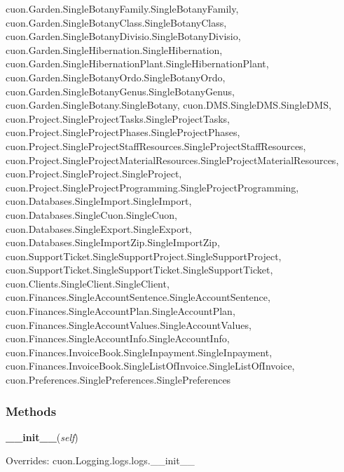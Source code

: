     cuon.Garden.SingleBotanyFamily.SingleBotanyFamily,
    cuon.Garden.SingleBotanyClass.SingleBotanyClass,
    cuon.Garden.SingleBotanyDivisio.SingleBotanyDivisio,
    cuon.Garden.SingleHibernation.SingleHibernation,
    cuon.Garden.SingleHibernationPlant.SingleHibernationPlant,
    cuon.Garden.SingleBotanyOrdo.SingleBotanyOrdo,
    cuon.Garden.SingleBotanyGenus.SingleBotanyGenus,
    cuon.Garden.SingleBotany.SingleBotany,
    cuon.DMS.SingleDMS.SingleDMS,
    cuon.Project.SingleProjectTasks.SingleProjectTasks,
    cuon.Project.SingleProjectPhases.SingleProjectPhases,
    cuon.Project.SingleProjectStaffResources.SingleProjectStaffResources,
    cuon.Project.SingleProjectMaterialResources.SingleProjectMaterialResources,
    cuon.Project.SingleProject.SingleProject,
    cuon.Project.SingleProjectProgramming.SingleProjectProgramming,
    cuon.Databases.SingleImport.SingleImport,
    cuon.Databases.SingleCuon.SingleCuon,
    cuon.Databases.SingleExport.SingleExport,
    cuon.Databases.SingleImportZip.SingleImportZip,
    cuon.SupportTicket.SingleSupportProject.SingleSupportProject,
    cuon.SupportTicket.SingleSupportTicket.SingleSupportTicket,
    cuon.Clients.SingleClient.SingleClient,
    cuon.Finances.SingleAccountSentence.SingleAccountSentence,
    cuon.Finances.SingleAccountPlan.SingleAccountPlan,
    cuon.Finances.SingleAccountValues.SingleAccountValues,
    cuon.Finances.SingleAccountInfo.SingleAccountInfo,
    cuon.Finances.InvoiceBook.SingleInpayment.SingleInpayment,
    cuon.Finances.InvoiceBook.SingleListOfInvoice.SingleListOfInvoice,
    cuon.Preferences.SinglePreferences.SinglePreferences



  \subsubsection{Methods}

    \vspace{0.5ex}

\hspace{.8\funcindent}\begin{boxedminipage}{\funcwidth}

    \raggedright \textbf{\_\_init\_\_}(\textit{self})

\setlength{\parskip}{2ex}
\setlength{\parskip}{1ex}
      Overrides: cuon.Logging.logs.logs.\_\_init\_\_

    \end{boxedminipage}

